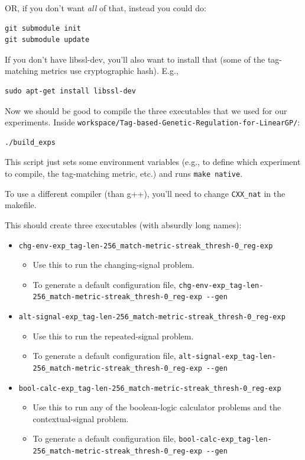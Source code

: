 \documentclass[
]{book}
\providecommand{\tightlist}{%
  \setlength{\itemsep}{0pt}\setlength{\parskip}{0pt}}
\begin{document}
OR, if you don't want \emph{all} of that, instead you could do:

\begin{verbatim}
git submodule init
git submodule update
\end{verbatim}

If you don't have libssl-dev, you'll also want to install that (some of the tag-matching metrics use cryptographic hash). E.g.,

\begin{verbatim}
sudo apt-get install libssl-dev
\end{verbatim}

Now we should be good to compile the three executables that we used for our experiments. Inside \texttt{workspace/Tag-based-Genetic-Regulation-for-LinearGP/}:

\begin{verbatim}
./build_exps
\end{verbatim}

This script just sets some environment variables (e.g., to define which experiment to compile, the tag-matching metric, etc.) and runs \texttt{make\ native}.

To use a different compiler (than g++), you'll need to change \texttt{CXX\_nat} in the makefile.

This should create three executables (with absurdly long names):

\begin{itemize}
\tightlist
\item
  \texttt{chg-env-exp\_tag-len-256\_match-metric-streak\_thresh-0\_reg-exp}

  \begin{itemize}
  \tightlist
  \item
    Use this to run the changing-signal problem.
  \item
    To generate a default configuration file, \texttt{chg-env-exp\_tag-len-256\_match-metric-streak\_thresh-0\_reg-exp\ -\/-gen}
  \end{itemize}
\item
  \texttt{alt-signal-exp\_tag-len-256\_match-metric-streak\_thresh-0\_reg-exp}

  \begin{itemize}
  \tightlist
  \item
    Use this to run the repeated-signal problem.
  \item
    To generate a default configuration file, \texttt{alt-signal-exp\_tag-len-256\_match-metric-streak\_thresh-0\_reg-exp\ -\/-gen}
  \end{itemize}
\item
  \texttt{bool-calc-exp\_tag-len-256\_match-metric-streak\_thresh-0\_reg-exp}

  \begin{itemize}
  \tightlist
  \item
    Use this to run any of the boolean-logic calculator problems and the contextual-signal problem.
  \item
    To generate a default configuration file, \texttt{bool-calc-exp\_tag-len-256\_match-metric-streak\_thresh-0\_reg-exp\ -\/-gen}
  \end{itemize}
\end{itemize}
\end{document}
